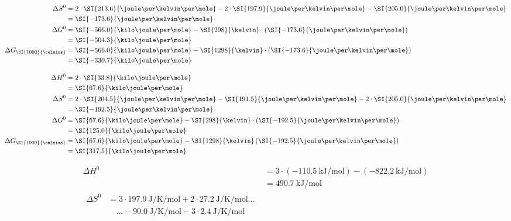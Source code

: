 \documentclass[ahaeffekt]{exercise}
\begin{document}
{\begin{alphlist}
\begin{align*}
        \Delta S^0 &= 2\cdot\SI{213.6}{\joule\per\kelvin\per\mole} -2\cdot\SI{197.9}{\joule\per\kelvin\per\mole}-\SI{205.0}{\joule\per\kelvin\per\mole}\\
        &= \SI{-173.6}{\joule\per\kelvin\per\mole} \\
        \Delta G^0 &= \SI{-566.0}{\kilo\joule\per\mole} - \SI{298}{\kelvin}\cdot\left(\SI{-173.6}{\joule\per\kelvin\per\mole}\right) \\
        &= \SI{-504.3}{\kilo\joule\per\mole} \\
        \Delta G_\text{\SI{1000}{\celsius}} &= \SI{-566.0}{\kilo\joule\per\mole} - \SI{1298}{\kelvin}\cdot\left(\SI{-173.6}{\joule\per\kelvin\per\mole}\right) \\
        &= \SI{-330.7}{\kilo\joule\per\mole}
       \end{align*}
 \item \begin{align*}
        \Delta H^0 &= 2\cdot\SI{33.8}{\kilo\joule\per\mole}\\
        &= \SI{67.6}{\kilo\joule\per\mole}\\
        \Delta S^0 &= 2\cdot\SI{204.5}{\joule\per\kelvin\per\mole} -\SI{191.5}{\joule\per\kelvin\per\mole} -2\cdot\SI{205.0}{\joule\per\kelvin\per\mole} \\
        &= \SI{-192.5}{\joule\per\kelvin\per\mole} \\
        \Delta G^0 &= \SI{67.6}{\kilo\joule\per\mole} - \SI{298}{\kelvin}\cdot\left(\SI{-192.5}{\joule\per\kelvin\per\mole}\right) \\
        &= \SI{125.0}{\kilo\joule\per\mole} \\
        \Delta G_\text{\SI{1000}{\celsius}} &= \SI{67.6}{\kilo\joule\per\mole} - \SI{1298}{\kelvin}\left(\SI{-192.5}{\joule\per\kelvin\per\mole}\right) \\
        &= \SI{317.5}{\kilo\joule\per\mole}
       \end{align*}
 \item \begin{align*}
        \Delta H^0 &= 3\cdot\left(\SI{-110.5}{\kilo\joule\per\mole}\right)-\left(\SI{-822.2}{\kilo\joule\per\mole}\right)\\
        &= \SI{490.7}{\kilo\joule\per\mole}\\
        \begin{split}
          \Delta S^0 &= 3\cdot\SI{197.9}{\joule\per\kelvin\per\mole} + 2\cdot\SI{27.2}{\joule\per\kelvin\per\mole}\ldots\\
                     &\quad\ldots - \SI{90.0}{\joule\per\kelvin\per\mole} -3\cdot\SI{2.4}{\joule\per\kelvin\per\mole}

\end{split}
\end{align*}
\end{alphlist}}
\end{document}
